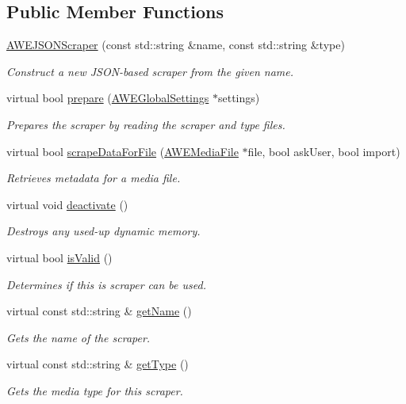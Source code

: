 \subsection*{Public Member Functions}
\begin{DoxyCompactItemize}
\item 
\hyperlink{class_a_w_e_j_s_o_n_scraper_a63d5eabda4e167ffae780da516e7d9a0}{A\-W\-E\-J\-S\-O\-N\-Scraper} (const std\-::string \&name, const std\-::string \&type)
\begin{DoxyCompactList}\small\item\em Construct a new J\-S\-O\-N-\/based scraper from the given name. \end{DoxyCompactList}\item 
virtual bool \hyperlink{class_a_w_e_j_s_o_n_scraper_a7d9bf7ebc9c847382b032db2d285ce50}{prepare} (\hyperlink{class_a_w_e_global_settings}{A\-W\-E\-Global\-Settings} $\ast$settings)
\begin{DoxyCompactList}\small\item\em Prepares the scraper by reading the scraper and type files. \end{DoxyCompactList}\item 
virtual bool \hyperlink{class_a_w_e_j_s_o_n_scraper_ad026b66fb8bfd6c03541cabb0bbad795}{scrape\-Data\-For\-File} (\hyperlink{class_a_w_e_media_file}{A\-W\-E\-Media\-File} $\ast$file, bool ask\-User, bool import)
\begin{DoxyCompactList}\small\item\em Retrieves metadata for a media file. \end{DoxyCompactList}\item 
virtual void \hyperlink{class_a_w_e_j_s_o_n_scraper_a73fc419457d42f667c37e000093d6a3b}{deactivate} ()
\begin{DoxyCompactList}\small\item\em Destroys any used-\/up dynamic memory. \end{DoxyCompactList}\item 
virtual bool \hyperlink{class_a_w_e_j_s_o_n_scraper_abd6ba5547f70fa6781b21232e6658e9e}{is\-Valid} ()
\begin{DoxyCompactList}\small\item\em Determines if this is scraper can be used. \end{DoxyCompactList}\item 
virtual const std\-::string \& \hyperlink{class_a_w_e_j_s_o_n_scraper_a0fb38d70c098deed8346faa860dce7f6}{get\-Name} ()
\begin{DoxyCompactList}\small\item\em Gets the name of the scraper. \end{DoxyCompactList}\item 
virtual const std\-::string \& \hyperlink{class_a_w_e_j_s_o_n_scraper_a3e1f765849d5c376596f8048b52958f3}{get\-Type} ()
\begin{DoxyCompactList}\small\item\em Gets the media type for this scraper. \end{DoxyCompactList}\end{DoxyCompactItemize}


